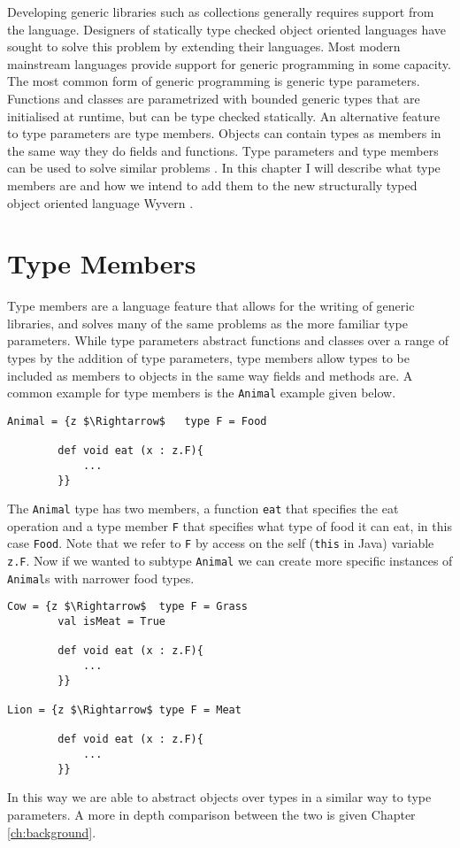 \documentclass[11pt
              , a4paper
              , twoside
              , openright
              ]{report}
\numberwithin{case}{theorem}
\numberwithin{subcase}{case}
\begin{document}
Developing generic libraries such as collections generally requires support from the language. Designers of statically type checked object oriented languages have sought to solve this problem by extending their languages. Most modern mainstream languages provide support for generic programming in some capacity. The most common form of generic programming is generic type parameters. Functions and classes are parametrized with bounded generic types that are initialised at runtime, but can be type checked statically. An alternative feature to type parameters are type members. Objects can contain types as members in the same way they do fields and functions. Type parameters and type members can be used to solve similar problems \cite{Igarashi1999}. In this chapter I will describe what type members are and how we intend to add them to the new structurally typed object oriented language Wyvern  \cite{Nistor:2013:WST:2489828.2489830}.

\section{Type Members}
Type members are a language feature that allows for the writing of generic libraries, and solves many of the same problems as the more familiar type parameters. While type parameters abstract functions and classes over a range of types by the addition of type parameters, type members allow types to be included as members to objects in the same way fields and methods are. A common example for type members is the \verb|Animal| example \cite{Igarashi1999, Amin:2014:FPT:2660193.2660216} given below.
\begin{lstlisting}[mathescape, style=custom_lang]
Animal = {z $\Rightarrow$	type F = Food
		
		def void eat (x : z.F){
			...
		}}
\end{lstlisting}
The \verb|Animal| type has two members, a function \verb|eat| that specifies the eat operation and a type member \verb|F| that specifies what type of food it can eat, in this case \verb|Food|.  Note that we refer to \verb|F| by access on the self (\verb|this| in Java) variable \verb|z.F|. Now if we wanted to subtype \verb|Animal| we can create more specific instances of \verb|Animal|s with narrower food types.
\begin{lstlisting}[mathescape, style=custom_lang]
Cow = {z $\Rightarrow$	type F = Grass
		val isMeat = True
		
		def void eat (x : z.F){
			...
		}}

Lion = {z $\Rightarrow$	type F = Meat
		
		def void eat (x : z.F){
			...
		}}
\end{lstlisting}
In this way we are able to abstract objects over types in a similar way to type parameters. A more in depth comparison between the two is given Chapter \ref{ch:background}.
\end{document}
